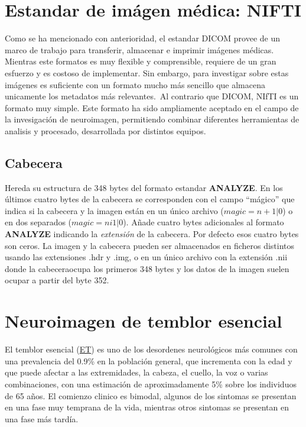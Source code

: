 \section{Estandar de imágen médica: NIFTI}

Como se ha mencionado con anterioridad, el estandar DICOM provee de un marco de trabajo para transferir, almacenar e imprimir imágenes médicas. Mientras este formatos es muy flexible y comprensible, requiere de un gran esfuerzo y es costoso de implementar. Sin embargo, para investigar sobre estas imágenes es suficiente con un formato mucho más sencillo que almacena unicamente los metadatos más relevantes.\
Al contrario que DICOM, NIfTI es un formato muy simple. Este formato ha sido ampliamente aceptado en el campo de la invesigación de neuroimagen, permitiendo combinar diferentes herramientas de analisis y procesado, desarrollada por distintos equipos.

\subsection{Cabecera}

Hereda su estructura de 348 bytes del formato estandar \textbf{ANALYZE}. En los últimos cuatro bytes de la cabecera se corresponden con el campo ``mágico'' que indica si la cabecera y la imagen están en un único archivo ($magic = n+1|0$) o en dos separados ($magic = ni1|0$). Añade cuatro bytes adicionales al formato \textbf{ANALYZE} indicando la \textit{extensión} de la cabecera. Por defecto esos cuatro bytes son ceros.
La imagen y la cabecera pueden ser almacenados en ficheros distintos usando las extensiones .hdr y .img, o en un único archivo con la extensión .nii donde la cabeceraocupa los primeros 348 bytes y los datos de la imagen suelen ocupar a partir del byte 352.

\section{Neuroimagen de temblor esencial}

El temblor esencial (\hyperref[glos:et]{ET}) es uno de los desordenes neurológicos más comunes con una prevalencia del 0.9\% en la población general, que incrementa con la edad y que puede afectar a las extremidades, la cabeza, el cuello, la voz o varias combinaciones, con una estimación de aproximadamente 5\% sobre los individuos de 65 años. El comienzo clinico es bimodal, algunos de los sintomas se presentan en una fase muy temprana de la vida, mientras otros sintomas se presentan en una fase más tardía. \cite{movedisorder,ethandbook,anderson}


